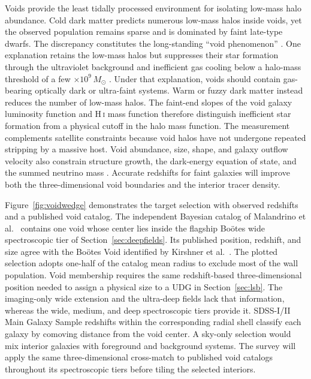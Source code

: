Voids provide the least tidally processed environment for isolating low-mass halo abundance. Cold dark matter predicts numerous low-mass halos inside voids, yet the observed population remains sparse and is dominated by faint late-type dwarfs. The discrepancy constitutes the long-standing ``void phenomenon'' \cite{peebles2001}. One explanation retains the low-mass halos but suppresses their star formation through the ultraviolet background and inefficient gas cooling below a halo-mass threshold of a few $\times10^{9}\,M_\odot$ \cite{hoeft2010}. Under that explanation, voids should contain gas-bearing optically dark or ultra-faint systems. Warm or fuzzy dark matter instead reduces the number of low-mass halos. The faint-end slopes of the void galaxy luminosity function and H\,\textsc{i} mass function therefore distinguish inefficient star formation from a physical cutoff in the halo mass function. The measurement complements satellite constraints because void halos have not undergone repeated stripping by a massive host. Void abundance, size, shape, and galaxy outflow velocity also constrain structure growth, the dark-energy equation of state, and the summed neutrino mass \cite{hamaus2016}. Accurate redshifts for faint galaxies will improve both the three-dimensional void boundaries and the interior tracer density.

Figure~\ref{fig:voidwedge} demonstrates the target selection with observed redshifts and a published void catalog. The independent Bayesian catalog of Malandrino et al.\ \cite{malandrino2026} contains one void whose center lies inside the flagship Bo\"otes wide spectroscopic tier of Section~\ref{sec:deepfields}. Its published position, redshift, and size agree with the Bo\"otes Void identified by Kirshner et al.\ \cite{kirshner1981,kirshner1987}. The plotted selection adopts one-half of the catalog mean radius to exclude most of the wall population. Void membership requires the same redshift-based three-dimensional position needed to assign a physical size to a UDG in Section~\ref{sec:lsb}. The imaging-only wide extension and the ultra-deep fields lack that information, whereas the wide, medium, and deep spectroscopic tiers provide it. SDSS-I/II Main Galaxy Sample redshifts within the corresponding radial shell classify each galaxy by comoving distance from the void center. A sky-only selection would mix interior galaxies with foreground and background systems. The survey will apply the same three-dimensional cross-match to published void catalogs throughout its spectroscopic tiers before tiling the selected interiors.

